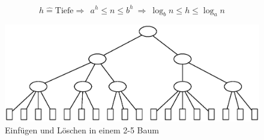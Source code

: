\[h\hat{=}\text{Tiefe}\Rightarrow ~~ a^h\leq n \leq b^h ~\Rightarrow ~ \log_b n \leq h \leq \log_a n\]
\begin{figure}[h]
\centering
\includegraphics[width=\linewidth]{12/Grafik/graph3}
\caption{Einfügen und Löschen in einem 2-5 Baum}
\label{fig:graph3}
\end{figure}

